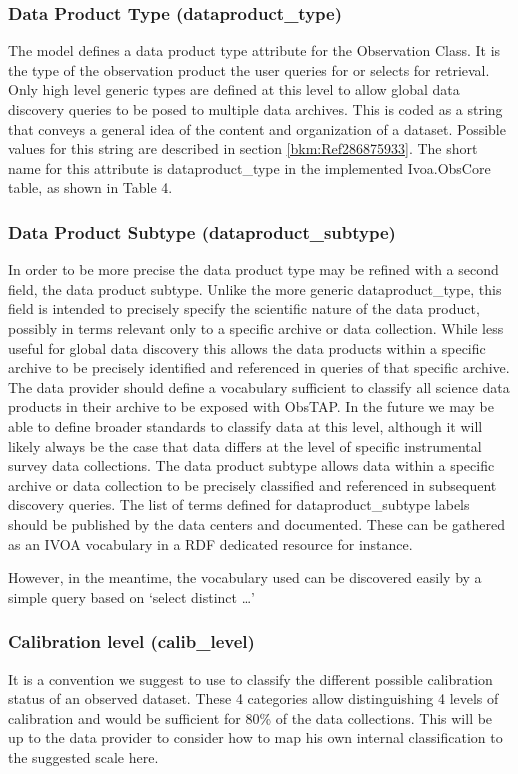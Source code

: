 \documentclass[11pt,a4paper]{ivoa}
\begin{document}
\subsubsection{Data Product Type (dataproduct\_type)}
The model defines a data product type attribute for the Observation Class.  It is the type of the observation product
the user queries for or selects for retrieval.  Only high level generic types are defined at this level to allow global
data discovery queries to be posed to multiple data archives.  This is coded as a string that conveys a general idea of
the content and organization of a dataset.  Possible values for this string are described in section
\ref{bkm:Ref286875933}.  The short name for this attribute is dataproduct\_type in the implemented Ivoa.ObsCore table,
as shown in Table 4.

\subsubsection{Data Product Subtype (dataproduct\_subtype)}
\label{bkm:Ref291536287}In order to be more precise the data product type may be refined with a second field, the data
product subtype.  Unlike the more generic dataproduct\_type, this field is intended to precisely specify the scientific
nature of the data product, possibly in terms relevant only to a specific archive or data collection.  While less
useful for global data discovery this allows the data products within a specific archive to be precisely identified and
referenced in queries of that specific archive.  The data provider should define a vocabulary sufficient to classify
all science data products in their archive to be exposed with ObsTAP.  In the future we may be able to define broader
standards to classify data at this level, although it will likely always be the case that data differs at the level of
specific instrumental survey data collections. The data product subtype allows data within a specific archive or data
collection to be precisely classified and referenced in subsequent discovery queries. The list of terms defined for
dataproduct\_subtype labels should be published by the data centers and documented. These can be gathered as an IVOA
vocabulary in a RDF dedicated resource for instance.

However, in the meantime, the vocabulary used can be discovered easily by a simple query based on `select distinct
{\dots}'

\subsubsection{Calibration level (calib\_level)}
It is a convention we suggest to use to classify the different possible calibration status of an observed dataset.
These 4 categories allow distinguishing 4 levels of calibration and would be sufficient for 80\% of the data
collections.  This will be up to the data provider to consider how to map his own internal classification to the
suggested scale here.
\end{document}
